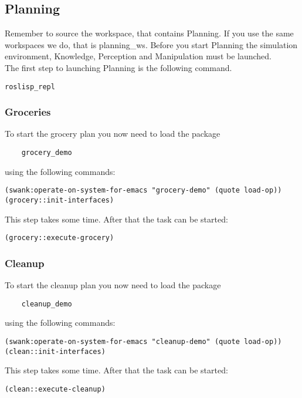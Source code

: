 \documentclass[main.tex]{subfiles}
\begin{document}
	\subsection{Planning}
	Remember to source the workspace, that contains Planning.
	If you use the same workspaces we do, that is planning\_ws.
	Before you start Planning the simulation environment, Knowledge, Perception and Manipulation must be launched.\\
	The first step to launching Planning is the following command.\\
	\begin{lstlisting}
roslisp_repl
\end{lstlisting}

	\subsubsection{Groceries}
	To start the grocery plan you now need to load the package\\ \begin{verbatim}
	grocery_demo
	\end{verbatim}
	 using the following commands:
	\begin{lstlisting}
(swank:operate-on-system-for-emacs "grocery-demo" (quote load-op))
(grocery::init-interfaces)
\end{lstlisting}
This step takes some time. After that the task can be started:\\
\begin{lstlisting}
(grocery::execute-grocery)
\end{lstlisting}

	\subsubsection{Cleanup}
	To start the cleanup plan you now need to load the package\\ \begin{verbatim}
	cleanup_demo
	\end{verbatim}
	 using the following commands:\\
	\begin{lstlisting}
(swank:operate-on-system-for-emacs "cleanup-demo" (quote load-op))
(clean::init-interfaces)
\end{lstlisting}
This step takes some time. After that the task can be started:\\
\begin{lstlisting}
(clean::execute-cleanup)
\end{lstlisting}
\end{document}
